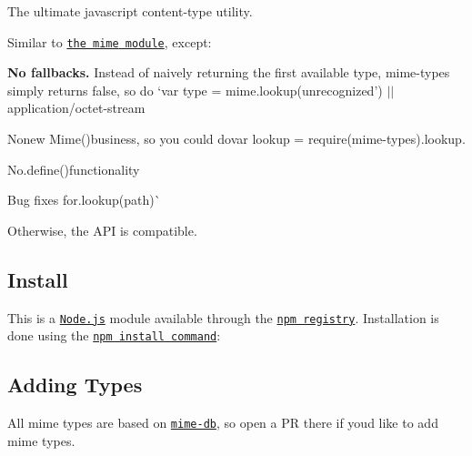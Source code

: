 \href{https://npmjs.org/package/mime-types}{\tt } \href{https://npmjs.org/package/mime-types}{\tt } \href{https://nodejs.org/en/download/}{\tt } \href{https://travis-ci.org/jshttp/mime-types}{\tt } \href{https://coveralls.io/r/jshttp/mime-types}{\tt }

The ultimate javascript content-\/type utility.

Similar to \href{https://www.npmjs.com/package/mime}{\tt the {\ttfamily mime} module}, except\+:


\begin{DoxyItemize}
\item {\bfseries No fallbacks.} Instead of naively returning the first available type, {\ttfamily mime-\/types} simply returns {\ttfamily false}, so do `var type = mime.\+lookup(\textquotesingle{}unrecognized') $\vert$$\vert$ \textquotesingle{}application/octet-\/stream
\item {\ttfamily No}new Mime(){\ttfamily business, so you could do}var lookup = require(\textquotesingle{}mime-\/types\textquotesingle{}).lookup{\ttfamily .}
\item {\ttfamily No}.define(){\ttfamily functionality}
\item {\ttfamily Bug fixes for}.lookup(path)\`{}
\end{DoxyItemize}

Otherwise, the A\+PI is compatible.

\subsection*{Install}

This is a \href{https://nodejs.org/en/}{\tt Node.\+js} module available through the \href{https://www.npmjs.com/}{\tt npm registry}. Installation is done using the \href{https://docs.npmjs.com/getting-started/installing-npm-packages-locally}{\tt {\ttfamily npm install} command}\+:




\subsection*{Adding Types}

All mime types are based on \href{https://www.npmjs.com/package/mime-db}{\tt mime-\/db}, so open a PR there if you\textquotesingle{}d like to add mime types.

